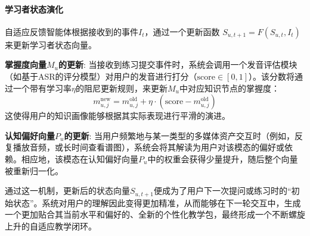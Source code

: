 \paragraph{学习者状态演化}
自适应反馈智能体根据接收到的事件$I_t$，通过一个更新函数 $S_{u, t+1} = F(S_{u, t}, I_t)$ 来更新学习者状态向量。

\textbf{掌握度向量$M_u$的更新}: 当接收到练习提交事件时，系统会调用一个发音评估模块（如基于ASR的评分模型）对用户的发音进行打分（$\text{score} \in [0,1]$）。该分数将通过一个带有学习率$\eta$的阻尼更新规则，来更新$M_u$中对应知识节点的掌握度：
$$ m_{u,j}^{\text{new}} = m_{u,j}^{\text{old}} + \eta \cdot (\text{score} - m_{u,j}^{\text{old}}) $$
这使得用户的知识画像能够根据其实际表现进行平滑的演进。

\textbf{认知偏好向量$P_u$的更新}: 当用户频繁地与某一类型的多媒体资产交互时（例如，反复播放音频，或长时间查看谱图），系统会将其解读为用户对该模态的偏好或依赖。相应地，该模态在认知偏好向量$P_u$中的权重会获得少量提升，随后整个向量被重新归一化。

通过这一机制，更新后的状态向量$S_{u, t+1}$便成为了用户下一次提问或练习时的“初始状态”。系统对用户的理解因此变得更加精准，从而能够在下一轮交互中，生成一个更加贴合其当前水平和偏好的、全新的个性化教学包，最终形成一个不断螺旋上升的自适应教学闭环。


